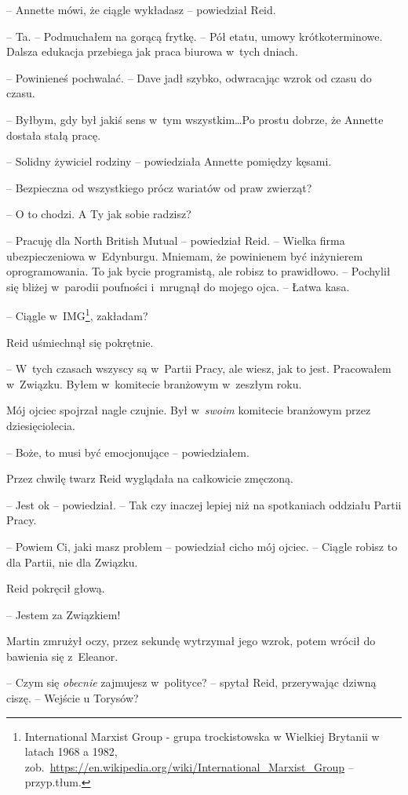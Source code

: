 \documentclass[oneside,polish,11pt,sfheadings]{mwbk}
\begin{document}
-- Annette mówi, że ciągle wykładasz -- powiedział Reid.

-- Ta. -- Podmuchałem na gorącą frytkę. -- Pół etatu, umowy
krótkoterminowe. Dalsza edukacja przebiega jak praca biurowa w~tych
dniach.

-- Powinieneś pochwalać. -- Dave jadł szybko, odwracając wzrok od czasu do
czasu.

-- Byłbym, gdy był jakiś sens w~tym wszystkim\ldots Po prostu dobrze, że
Annette dostała stałą pracę.

-- Solidny żywiciel rodziny -- powiedziała Annette pomiędzy kęsami.

-- Bezpieczna od wszystkiego prócz wariatów od praw zwierząt?

-- O to chodzi. A Ty jak sobie radzisz?

-- Pracuję dla North British Mutual -- powiedział Reid. -- Wielka firma
ubezpieczeniowa w~Edynburgu. Mniemam, że powinienem być inżynierem
oprogramowania. To jak bycie programistą, ale robisz to prawidłowo. -- Pochylił się bliżej w~parodii poufności i~mrugnął do mojego ojca. -- Łatwa kasa.

-- Ciągle w~IMG\footnote{International Marxist Group - grupa trockistowska w Wielkiej Brytanii w latach 1968 a 1982, zob.~\url{https://en.wikipedia.org/wiki/International_Marxist_Group}  -- przyp.tłum.}, zakładam?

Reid uśmiechnął się pokrętnie. 

-- W~tych czasach wszyscy są w~Partii
Pracy, ale wiesz, jak to jest. Pracowałem w~Związku. Byłem w~komitecie
branżowym w~zeszłym roku.

Mój ojciec spojrzał nagle czujnie. Był w~\emph{swoim} komitecie
branżowym przez dziesięciolecia.

-- Boże, to musi być emocjonujące -- powiedziałem.

Przez chwilę twarz Reid wyglądała na całkowicie zmęczoną.

-- Jest ok -- powiedział. -- Tak czy inaczej lepiej niż na spotkaniach
oddziału Partii Pracy.

-- Powiem Ci, jaki masz problem -- powiedział cicho mój ojciec. -- Ciągle
robisz to dla Partii, nie dla Związku.

Reid pokręcił głową. 

-- Jestem za Związkiem!

Martin zmrużył oczy, przez sekundę wytrzymał jego wzrok, potem wrócił do
bawienia się z~Eleanor.

-- Czym się \emph{obecnie }zajmujesz w~polityce? -- spytał Reid,
przerywając dziwną ciszę. -- Wejście u Torysów?
\end{document}
